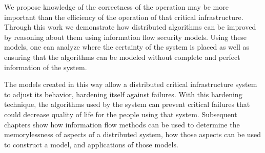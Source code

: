 We propose knowledge of the correctness of the operation may be more important than the efficiency of the operation of that critical infrastructure.
Through this work we demonstrate how distributed algorithms can be improved by reasoning about them using information flow security models.
Using these models, one can analyze where the certainty of the system is placed as well as ensuring that the algorithms can be modeled without complete and perfect information of the system.

The models created in this way allow a distributed critical infrastructure system to adjust its behavior, hardening itself against failures.
With this hardening technique, the algorithms used by the system can prevent critical failures that could decrease quality of life for the people using that system.
Subsequent chapters show how information flow methods can be used to determine the memorylessness of aspects of a distributed system, how those aspects can be used to construct a model, and applications of those models.
